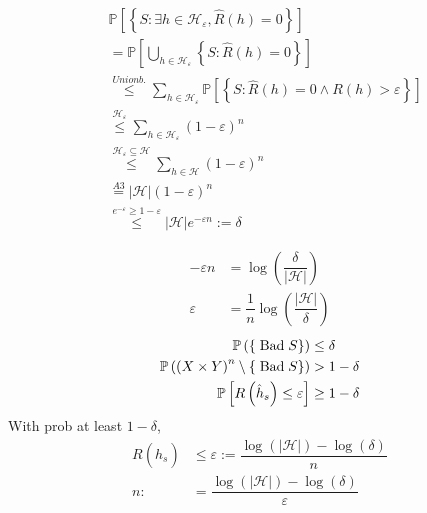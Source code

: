 \documentclass{article}
\begin{document}
\begin{align*}
&  \mathbb{P} \left[\left\{S : \exists h \in \mathcal{H}_{\varepsilon}, \hat{R}\left(h\right) = 0\right\}\right]
\\ &= \mathbb{P} \left[\displaystyle\bigcup _{h \in \mathcal{H}_{\varepsilon}} \left\{S: \hat{R}\left(h\right) = 0\right\}\right]
\\ &\stackrel{Union b.}{\leq} \displaystyle\sum_{h \in \mathcal{H}_{\varepsilon}} \mathbb{P}\left[\left\{S: \hat{R}\left(h\right) = 0 \wedge R\left(h\right) > \varepsilon\right\}\right]
\\ &\stackrel{\mathcal{H}_{\varepsilon}}{\leq} \displaystyle\sum_{h \in \mathcal{H}_{\varepsilon}} \left(1 - \varepsilon\right)^{n}
\\ &\stackrel{\mathcal{H}_{\varepsilon} \subseteq \mathcal{H}}{\leq} \displaystyle\sum_{h \in \mathcal{H}} \left(1 - \varepsilon\right)^{n}
\\ &\stackrel{A3}{=} | \mathcal{H} | \left(1 - \varepsilon\right)^{n}
\\ &\stackrel{e^{-\varepsilon} \geq  1 - \varepsilon}{\leq} | \mathcal{H} | e^{-\varepsilon n} := \delta
\end{align*}
\begin{figure}[H] \centering {} 
\end{figure}
\begin{align*}
- \varepsilon n &= \log\left(\dfrac{\delta}{| \mathcal{H} |}\right)
\\ \varepsilon &= \dfrac{1}{n} \log\left(\dfrac{| \mathcal{H} |}{\delta}\right)
\end{align*}
\begin{align*}
\mathbb{P}\left(\left\{\text{\;Bad\;} S\right\}\right) &\leq  \delta
\\ \mathbb{P}\left(\left(X \times Y\right)^{n} \setminus  \left\{\text{\;Bad\;} S\right\}\right) &> 1 - \delta
\\ \mathbb{P}\left[R\left(\hat{h}_{s}\right) \leq  \varepsilon\right] &\geq  1 - \delta
\end{align*}
With prob at least $1 - \delta$,
\begin{align*}
R\left(\hat{h}_{s}\right)  &\leq  \varepsilon := \dfrac{\log\left(| \mathcal{H} |\right) - \log\left(\delta\right)}{n}
\\ n  :&= \dfrac{\log\left(| \mathcal{H} |\right) - \log\left(\delta\right)}{\varepsilon}
\end{align*}
\end{document}
